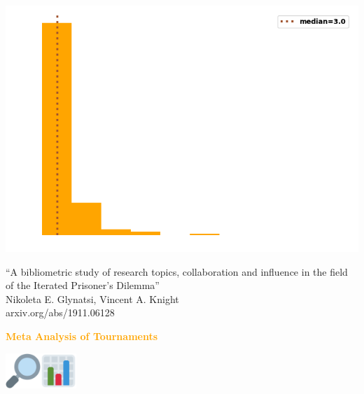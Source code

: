 \documentclass{beamer}
\begin{document}
\begin{frame}
    \begin{center}
        \includegraphics[width=.7\textwidth]{static/degree_dist.png}
    \end{center}
\end{frame}

\begin{frame}
    \begin{center}
    
    \end{center}
\end{frame}

\begin{frame}
    \begin{center}
    
    \end{center}
\end{frame}

\begin{frame}
    \begin{center}
        \large{``A bibliometric study of research topics, collaboration and influence in the field of the Iterated Prisoner's Dilemma''} \\ \vspace{.5cm}
        \footnotesize{Nikoleta E. Glynatsi, Vincent A. Knight} \\ \vspace{.5cm}
        \footnotesize{arxiv.org/abs/1911.06128}
    \end{center}
\end{frame}

\begin{frame}
    \begin{center}
    \textcolor{orange}{\large{\textbf{Meta Analysis of Tournaments}}} \vspace{1cm}

    \includegraphics[width=0.10\textwidth]{static/look.png}\hspace{2pt}\includegraphics[width=0.10\textwidth]{static/bar.png}
    \end{center}
\end{frame}
\end{document}
